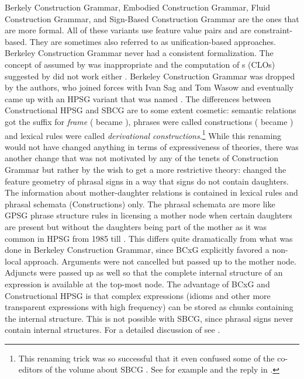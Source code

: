 \documentclass[output=paper]{langsci/langscibook}
\begin{document}
Berkely Construction Grammar, Embodied Construction Grammar, Fluid Construction Grammar, and
Sign-Based Construction Grammar are the ones that are more formal. All of these variants use feature
value pairs and are constraint-based. They are sometimes also referred to as unification-based
approaches. Berkeley Construction Grammar never had a consistent formalization. The concept of
 assumed by \citet{KF99a} was inappropriate \citep[Section~2.4]{Mueller2006d} and the computation of s (CLOs) suggested  by \citet{Kay2002a} did not work either \citep[Section~3]{Mueller2006d}. Berkeley Construction
Grammar was dropped by the authors, who joined forces with Ivan Sag and Tom Wasow and eventually
came up with an HPSG variant that was named \sbcg \citep{Sag2012a}. The differences between
Constructional HPSG \citep{Sag97a} and SBCG are to some extent cosmetic: semantic relations got the
suffix  for \emph{frame} ( became ), phrases were called constructions ( became
) and lexical rules were called \emph{derivational constructions}.\footnote{
This renaming trick was so successful that it even confused some of the co-editors of the volume about
SBCG \citep{BS2012a-ed}. See for example  and the reply in .
}
While this renaming would not have changed anything in terms of expressiveness of theories, there
was another change that was not motivated by any of the tenets of Construction Grammar but rather by
the wish to get a more restrictive theory: \citet{Sag2007a} changed the feature geometry of phrasal
signs in a way that signs do not contain daughters. The information about mother-daughter relations
is contained in lexical rules and phrasal schemata (Constructions) only. The phrasal schemata are
more like GPSG phrase structure rules in licensing a mother node when certain daughters are present
but without the daughters being part of the mother as it was common in HPSG from 1985 till
. This differs quite dramatically from what was done in Berkeley Construction
Grammar, since BCxG explicitly favored a non-local approach. Arguments were not cancelled but
passed up to the mother node. Adjuncts were passed up as well so that the complete internal
structure of an expression is available at the top-most node. The advantage of BCxG \citep{FKoC88a} and
Constructional HPSG \citep{Sag97a} is that complex expressions (\eg idioms and other more transparent expressions
with high frequency) can be stored as chunks containing the internal structure. This is not possible
with SBCG, since phrasal signs never contain internal structures. For a detailed discussion of \sbcg
see .
\end{document}
